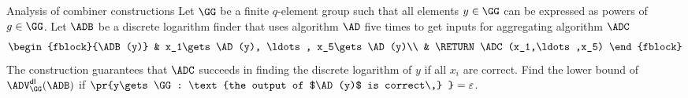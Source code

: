 \documentclass{crypto-exercise}
\author[Formalisation of folklore]{Sven Laur}
\begin{document}
\begin{exercise}{Analysis of combiner constructions}
Let $\GG$ be a finite $q$-element group such that all elements $y\in\GG$ can be expressed as powers of $g\in\GG$.  Let $\ADB$ be
a discrete logarithm finder that uses algorithm $\AD$ five times to get inputs for aggregating algorithm $\ADC$
\begin{align*}
    \begin{fblock}{\ADB(y)}
    & x_1\gets\AD(y), \ldots, x_5\gets\AD(y)\\
    & \RETURN \ADC(x_1,\ldots,x_5)
    \end{fblock}     
\end{align*}
The construction guarantees that $\ADC$ succeeds in finding the discrete logarithm of $y$ if all $x_i$ are correct. 
Find the lower bound of $\ADVDL{\GG}{\ADB}$ if $\pr{y\gets \GG: \text{the output of $\AD(y)$ is correct\,} } = \varepsilon$. 
\end{exercise}
  
\end{document}
